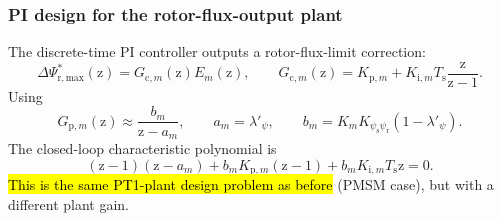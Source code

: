 \begin{frame}
    \frametitle{PI design for the rotor-flux-output plant}
    The discrete-time PI controller outputs a rotor-flux-limit correction:
    \begin{equation}
        \Delta\Psi_{\mathrm{r,max}}^{*}(\mathrm{z})
        =G_{\mathrm{c},m}(\mathrm{z})E_m(\mathrm{z}),
        \qquad
        G_{\mathrm{c},m}(\mathrm{z})
        =K_{\mathrm{p},m}+K_{\mathrm{i},m}T_{\mathrm{s}}\frac{\mathrm{z}}{\mathrm{z}-1} .
        \label{eq:IM_mod_v06_PI_rotor_output}
    \end{equation}\pause%
    Using
    \begin{equation}
        G_{\mathrm{p},m}(\mathrm{z})
        \approx\frac{b_m}{\mathrm{z}-a_m},
        \qquad
        a_m=\lambda'_{\psi},
        \qquad
        b_m=K_mK_{\psi_{\mathrm{s}}\psi_{\mathrm r}}(1-\lambda'_{\psi}) .
        \label{eq:IM_mod_v06_PT1_for_design}
    \end{equation}\pause%
    The closed-loop characteristic polynomial is
    \begin{equation}
        (\mathrm{z}-1)(\mathrm{z}-a_m)+b_mK_{\mathrm{p},m}(\mathrm{z}-1)+b_mK_{\mathrm{i},m}T_{\mathrm{s}}\mathrm{z}=0 .
        \label{eq:IM_mod_v06_char_poly}
    \end{equation}
    \hl{This is the same PT1-plant design problem as before} (PMSM case), but with a different plant gain.
\end{frame}

